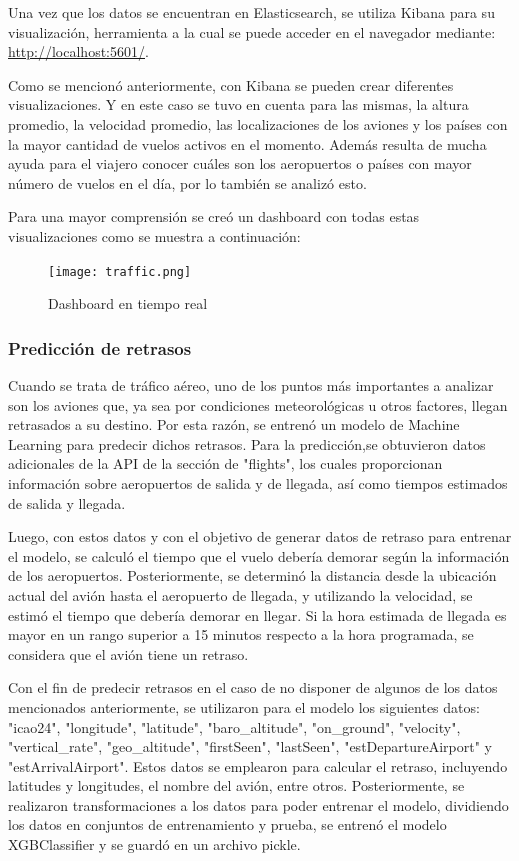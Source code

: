 \documentclass{article}
\begin{document}
Una vez que los datos se encuentran en Elasticsearch, se utiliza Kibana para su visualización, herramienta a la cual se puede acceder en el navegador mediante: \url{http://localhost:5601/}. 

Como se mencionó anteriormente, con Kibana se pueden crear diferentes visualizaciones. Y en este caso se tuvo en cuenta para las mismas, la altura promedio, la velocidad promedio, las localizaciones de los aviones y  los países con la mayor cantidad de vuelos activos en el momento. Además resulta de mucha ayuda para el viajero conocer cuáles son los aeropuertos o países con mayor número de vuelos en el día, por lo también se analizó esto.

Para una mayor comprensión se creó un dashboard con todas estas visualizaciones como se muestra a continuación:

\begin{figure}[h]
    \centering
    \texttt{[image: traffic.png]}
    \caption{Dashboard en tiempo real}
\end{figure}

\subsubsection{Predicción de retrasos}

Cuando se trata de tráfico aéreo, uno de los puntos más importantes a analizar son los aviones que, ya sea por condiciones meteorológicas u otros factores, llegan retrasados a su destino. Por esta razón, se entrenó un modelo de Machine Learning para predecir dichos retrasos. Para la predicción,se obtuvieron datos adicionales de la API de la sección de "flights", los cuales proporcionan información sobre aeropuertos de salida y de llegada, así como tiempos estimados de salida y llegada. 

Luego, con estos datos y con el objetivo de generar datos de retraso para entrenar el modelo, se calculó el tiempo que el vuelo debería demorar según la información de los aeropuertos. Posteriormente, se determinó la distancia desde la ubicación actual del avión hasta el aeropuerto de llegada, y utilizando la velocidad, se estimó el tiempo que debería demorar en llegar. Si la hora estimada de llegada es mayor en un rango superior a 15 minutos respecto a la hora programada, se considera que el avión tiene un retraso.

Con el fin de predecir retrasos en el caso de no disponer de algunos de los datos mencionados anteriormente, se utilizaron para el modelo los siguientes datos: "icao24", "longitude", "latitude", "baro\_altitude", "on\_ground", "velocity", "vertical\_rate", "geo\_altitude", "firstSeen", "lastSeen", "estDepartureAirport" y "estArrivalAirport". Estos datos se emplearon para calcular el retraso, incluyendo latitudes y longitudes, el nombre del avión, entre otros. Posteriormente, se realizaron transformaciones a los datos para poder entrenar el modelo, dividiendo los datos en conjuntos de entrenamiento y prueba, se entrenó el modelo XGBClassifier y se guardó en un archivo pickle.
\end{document}
